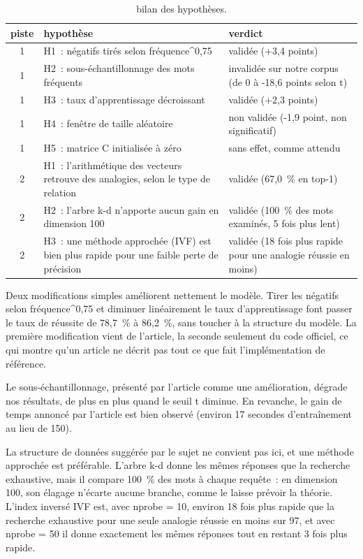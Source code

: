 \documentclass[11pt,a4paper]{article}
\begin{document}
\begin{table}[!htbp]
\centering
\small
\caption{bilan des hypothèses.}
\begin{tabularx}{\linewidth}{c>{\raggedright\arraybackslash}X>{\raggedright\arraybackslash}X}
\toprule
\textbf{piste} & \textbf{hypothèse} & \textbf{verdict} \\
\midrule
1 & H1~: négatifs tirés selon fréquence\textasciicircum{}0,75 & validée (+3,4 points) \\
1 & H2~: sous-échantillonnage des mots fréquents & invalidée sur notre corpus (de 0 à -18,6 points selon t) \\
1 & H3~: taux d’apprentissage décroissant & validée (+2,3 points) \\
1 & H4~: fenêtre de taille aléatoire & non validée (-1,9 point, non significatif) \\
1 & H5~: matrice C initialisée à zéro & sans effet, comme attendu \\
2 & H1~: l’arithmétique des vecteurs retrouve des analogies, selon le type de relation & validée (67,0~\% en top-1) \\
2 & H2~: l’arbre k-d n’apporte aucun gain en dimension 100 & validée (100~\% des mots examinés, 5 fois plus lent) \\
2 & H3~: une méthode approchée (IVF) est bien plus rapide pour une faible perte de précision & validée (18 fois plus rapide pour une analogie réussie en moins) \\
\bottomrule
\end{tabularx}
\end{table}

Deux modifications simples améliorent nettement le modèle. Tirer les négatifs selon fréquence\textasciicircum{}0,75 et diminuer linéairement le taux d’apprentissage font passer le taux de réussite de 78,7~\% à 86,2~\%, sans toucher à la structure du modèle. La première modification vient de l’article, la seconde seulement du code officiel, ce qui montre qu’un article ne décrit pas tout ce que fait l’implémentation de référence.

Le sous-échantillonnage, présenté par l’article comme une amélioration, dégrade nos résultats, de plus en plus quand le seuil t diminue. En revanche, le gain de temps annoncé par l’article est bien observé (environ 17 secondes d’entraînement au lieu de 150).

La structure de données suggérée par le sujet ne convient pas ici, et une méthode approchée est préférable. L’arbre k-d donne les mêmes réponses que la recherche exhaustive, mais il compare 100~\% des mots à chaque requête~: en dimension 100, son élagage n’écarte aucune branche, comme le laisse prévoir la théorie. L’index inversé IVF est, avec nprobe = 10, environ 18 fois plus rapide que la recherche exhaustive pour une seule analogie réussie en moins sur 97, et avec nprobe = 50 il donne exactement les mêmes réponses tout en restant 3 fois plus rapide.
\end{document}
